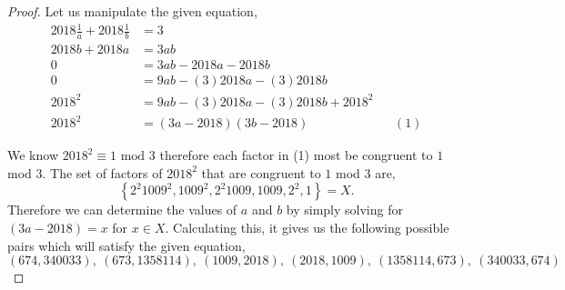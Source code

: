 \documentclass[11pt]{article}
\newcommand{\set}[1]{\left\{#1\right\}} %
\begin{document}
\begin{proof}
    Let us manipulate the given equation,
    \begin{align*}
         2018\frac{1}{a} + 2018\frac{1}{b} &= 3 \\
         2018b + 2018a &= 3ab \\
         0 &= 3ab -2018a -2018b \\
         0 &= 9ab - (3)2018a - (3)2018b \\
         2018^{2} &= 9ab -(3)2018a - (3)2018b + 2018^{2} \\
         2018^{2} &= (3a-2018)(3b - 2018) && (1)
    \end{align*}

    We know $2018^{2} \equiv 1 \text{ mod }3$ therefore each factor in (1) most be congruent to $1$ mod $3$. The set of factors of $2018^{2}$ that are congruent to $1$ mod $3$ are,
    \[\set{2^{2}1009^{2}, 1009^{2}, 2^{2}1009, 1009, 2^{2}, 1} = X.\]
    Therefore we can determine the values of $a$ and $b$ by simply solving for $(3a - 2018) = x $ for $x \in X$. Calculating this, it gives us the following possible pairs which will satisfy the given equation,
    \[(674, 340033),\ (673, 1358114),\ (1009,2018), \ (2018,1009), \ (1358114, 673), \ (340033, 674)\] 
\end{proof}
\end{document}
